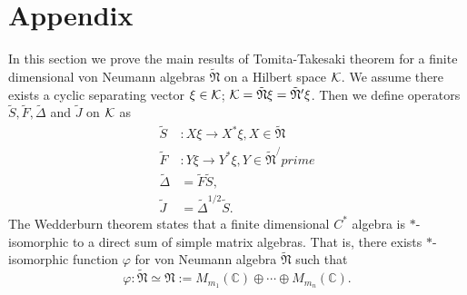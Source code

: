 \section{Appendix}
In this section we prove the main results of Tomita-Takesaki theorem for a finite dimensional
von Neumann algebras $\tilde{\mathfrak{N}}$ on a Hilbert space $\cal{K}$.
We assume there exists a cyclic separating vector $\xi\in \cal{K}$;
$\cal{K}=\tilde{\mathfrak{N}}\xi=\tilde{\mathfrak{N}}^\prime\xi$.
Then we define operators $\tilde{S},\tilde{F},\tilde{\Delta}$ and $\tilde{J}$ on $\cal{K}$ as
\begin{equation}
\begin{split}
\tilde{S}&:X\xi \to X^\ast \xi , X\in \tilde{\mathfrak{N}}\\
\tilde{F}&:Y\xi \to Y^\ast \xi , Y\in \tilde{\mathfrak{N}}^/prime\\
\tilde{\Delta}&=\tilde{F}\tilde{S},\\
\tilde{J}&=\tilde{\Delta}^{1/2}\tilde{S}.
\end{split}
\end{equation}
The Wedderburn theorem states that a finite dimensional $C^{\ast}$ algebra is  $\ast$-isomorphic to a direct sum of simple matrix algebras. That is, there exists $\ast$-isomorphic function $\varphi$ for von Neumann algebra $\tilde{\mathfrak{N}}$ such that
$$
\varphi:\tilde{\mathfrak{N}}\simeq \mathfrak{N}:=M_{m_1}(\mathbb{C})\oplus \cdots \oplus M_{m_n}(\mathbb{C}).
$$

